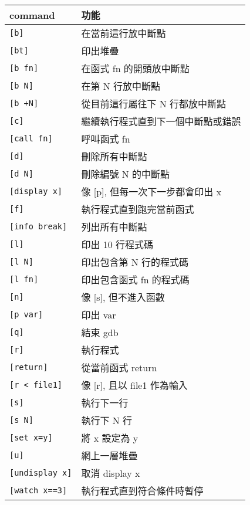 \begin{tabular}[c]{|l|l|}
    \hline
    command             & 功能 \\
    \hline
    \verb|[b]|          & 在當前這行放中斷點 \\
    \verb|[bt]|         & 印出堆疊 \\
    \verb|[b fn]|       & 在函式 fn 的開頭放中斷點 \\
    \verb|[b N]|        & 在第 N 行放中斷點 \\
    \verb|[b +N]|       & 從目前這行屬往下 N 行都放中斷點 \\
    \verb|[c]|          & 繼續執行程式直到下一個中斷點或錯誤 \\
    \verb|[call fn]|    & 呼叫函式 fn \\
    \verb|[d]|          & 刪除所有中斷點 \\
    \verb|[d N]|        & 刪除編號 N 的中斷點 \\
    \verb|[display x]|  & 像 [p], 但每一次下一步都會印出 x \\
    \verb|[f]|          & 執行程式直到跑完當前函式 \\
    \verb|[info break]| & 列出所有中斷點 \\
    \verb|[l]|          & 印出 10 行程式碼  \\
    \verb|[l N]|        & 印出包含第 N 行的程式碼  \\
    \verb|[l fn]|       & 印出包含函式 fn 的程式碼 \\
    \verb|[n]|          & 像 [s], 但不進入函數 \\
    \verb|[p var]|      & 印出 var \\
    \verb|[q]|          & 結束 gdb \\
    \verb|[r]|          & 執行程式 \\
    \verb|[return]|     & 從當前函式 return \\
    \verb|[r < file1]|  & 像 [r], 且以 file1 作為輸入 \\
    \verb|[s]|          & 執行下一行 \\
    \verb|[s N]|        & 執行下 N 行 \\
    \verb|[set x=y]|    & 將 x 設定為 y \\
    \verb|[u]|          & 網上一層堆疊 \\
    \verb|[undisplay x]| & 取消 display x \\
    \verb|[watch x==3]| & 執行程式直到符合條件時暫停 \\
    \hline
\end{tabular}